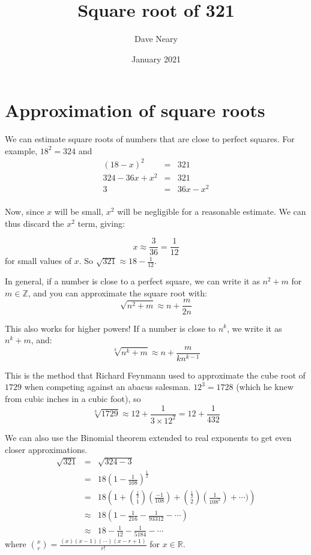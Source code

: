\documentclass{article}
\title{Square root of 321}
\author{Dave Neary}
\date{January 2021}
\begin{document}
\section{Approximation of square roots}

We can estimate square roots of numbers that are close to perfect squares. For example, $18^2 = 324$
and
\begin{eqnarray*}
(18-x)^2& =& 321\\
324 - 36x + x^2 & =& 321\\
3 &=& 36x - x^2 \\
\end{eqnarray*}

Now, since $x$ will be small, $x^2$ will be negligible for a reasonable estimate. We can thus
discard the $x^2$ term, giving:

\[ x \approx \frac{3}{36} = \frac{1}{12}\]
for small values of $x$. So $\sqrt{321} \approx 18 - \frac{1}{12}$.

In general, if a number is close to a perfect square, we can write it as $n^2 + m$ for
$m\in \mathbb{Z}$, and you can approximate the square root with:
\[\sqrt{n^2+m} \approx n+\frac{m}{2n}\]

This also works for higher powers! If a number is close to $n^k$, we write it as $n^k+m$, and:
\[ \sqrt[k]{n^k+m} \approx n+\frac{m}{kn^{k-1}} \]

This is the method that Richard Feynmann used to approximate the cube root of $1729$ when
competing against an abacus salesman. $12^3 = 1728$ (which he knew from cubic inches in a cubic foot), so
\[ \sqrt[3]{1729} \approx 12 + \frac{1}{3\times12^2} = 12+\frac{1}{432} \]

We can also use the Binomial theorem extended to real exponents to get even closer approximations.
\begin{eqnarray*}
 \sqrt{321}& =& \sqrt{324 - 3} \\
& = & 18 \left(1-\frac{1}{108}\right)^{\frac{1}{2}} \\
& = &18 \left( 1 + \binom{\frac{1}{2}}{1}\left(\frac{-1}{108}\right) + \binom{\frac{1}{2}}{2}\left(\frac{1}{108^2}\right) + \cdots ) \right) \\
& \approx & 18 \left(1 - \frac{1}{216} - \frac{1}{93312} - \cdots\right) \\
& \approx & 18 - \frac{1}{12} - \frac{1}{5184} - \cdots
\end{eqnarray*}
where $\binom{x}{r} = \frac{(x)(x-1)(\cdots)(x-r+1)}{r!}$ for $x \in \mathbb{R}$.

 
\end{document}
